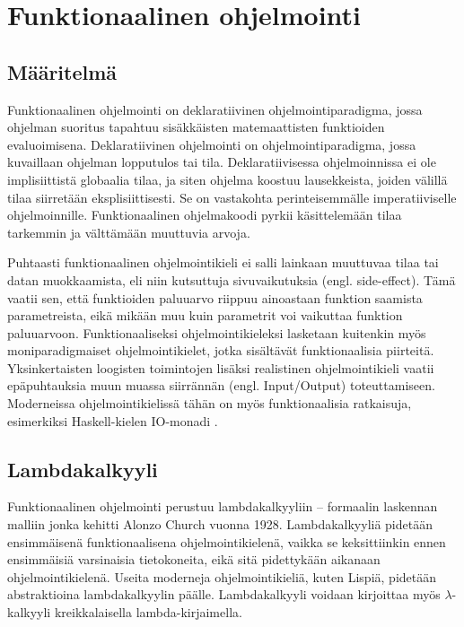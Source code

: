 \chapter{Funktionaalinen ohjelmointi} \label{Funktionaalinen ohjelmointi}

\section{Määritelmä}
Funktionaalinen ohjelmointi on deklaratiivinen ohjelmointiparadigma, jossa ohjelman suoritus tapahtuu sisäkkäisten
matemaattisten funktioiden evaluoimisena. Deklaratiivinen ohjelmointi on ohjelmointiparadigma, jossa kuvaillaan ohjelman
lopputulos tai tila. Deklaratiivisessa ohjelmoinnissa ei ole implisiittistä globaalia tilaa, ja siten ohjelma koostuu
lausekkeista, joiden välillä tilaa siirretään eksplisiittisesti. Se on vastakohta perinteisemmälle imperatiiviselle 
ohjelmoinnille. Funktionaalinen ohjelmakoodi pyrkii käsittelemään tilaa tarkemmin ja välttämään muuttuvia
arvoja. \cite{hudak}

Puhtaasti funktionaalinen ohjelmointikieli ei salli lainkaan muuttuvaa tilaa tai datan muokkaamista, eli niin kutsuttuja
sivuvaikutuksia (engl. side-effect). Tämä vaatii sen, että funktioiden paluuarvo riippuu ainoastaan funktion saamista
parametreista, eikä mikään muu kuin parametrit voi vaikuttaa funktion paluuarvoon. Funktionaaliseksi ohjelmointikieleksi
lasketaan kuitenkin myös moniparadigmaiset ohjelmointikielet, jotka sisältävät funktionaalisia piirteitä.
Yksinkertaisten loogisten toimintojen lisäksi realistinen ohjelmointikieli vaatii epäpuhtauksia muun muassa siirrännän
(engl. Input/Output) toteuttamiseen. \cite{purelyFunctional} Moderneissa ohjelmointikielissä tähän on myös
funktionaalisia ratkaisuja, esimerkiksi Haskell-kielen IO-monadi \cite{learnhaskell}.

\section{Lambdakalkyyli}
Funktionaalinen ohjelmointi perustuu lambdakalkyyliin – formaalin laskennan malliin jonka kehitti Alonzo Church vuonna
1928. Lambdakalkyyliä pidetään ensimmäisenä funktionaalisena ohjelmointikielenä, vaikka se keksittiinkin ennen
ensimmäisiä varsinaisia tietokoneita, eikä sitä pidettykään aikanaan ohjelmointikielenä. Useita moderneja
ohjelmointikieliä, kuten Lispiä, pidetään abstraktioina lambdakalkyylin päälle. Lambdakalkyyli voidaan kirjoittaa myös
$ \lambda $-kalkyyli kreikkalaisella lambda-kirjaimella. \cite{hudak}

